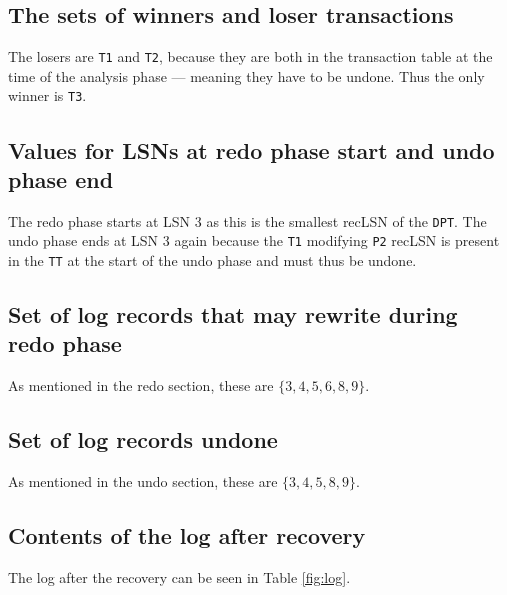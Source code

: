 \subsection{The sets of winners and loser transactions}
The losers are {\tt T1} and {\tt T2}, because they are both in the transaction
table at the time of the analysis phase --- meaning they have to be undone.
Thus the only winner is {\tt T3}.

\subsection{Values for LSNs at redo phase start and undo phase end}
The redo phase starts at LSN 3 as this is the smallest recLSN of the {\tt DPT}. The undo phase ends at LSN 3 again because the {\tt T1} modifying {\tt P2} recLSN is present in the {\tt TT} at the start of the undo phase and must thus be undone.

\subsection{Set of log records that may rewrite during redo phase}
As mentioned in the redo section, these are $\{3,4,5,6,8,9\}$.

\subsection{Set of log records undone}
As mentioned in the undo section, these are $\{3,4,5,8,9\}$.

\subsection{Contents of the log after recovery}
The log after the recovery can be seen in Table \ref{fig:log}.

